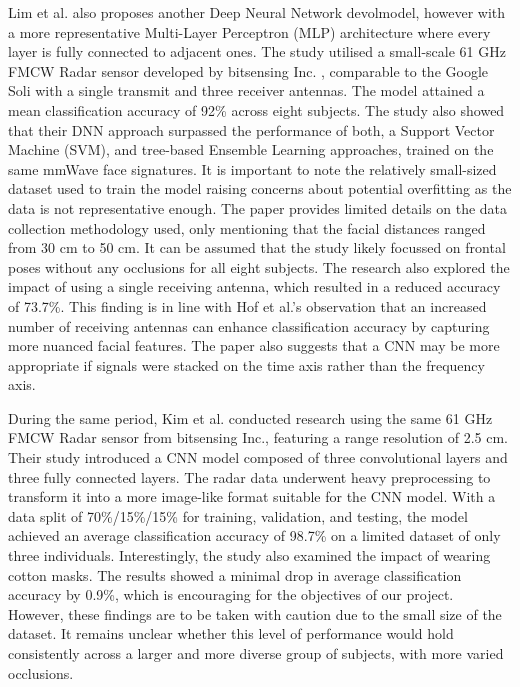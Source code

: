 \documentclass{interim}
\begin{document}
Lim et al. \cite{lim2020dnn} also proposes another Deep Neural Network devolmodel, however with a more representative Multi-Layer Perceptron (MLP) architecture where every layer is fully connected to adjacent ones. The study utilised a small-scale 61 GHz FMCW Radar sensor developed by bitsensing Inc. \cite{bitsensing2020bts60}, comparable to the Google Soli with a single transmit and three receiver antennas. The model attained a mean classification accuracy of 92\% across eight subjects. The study also showed that their DNN approach surpassed the performance of both, a Support Vector Machine (SVM), and tree-based Ensemble Learning approaches, trained on the same mmWave face signatures. It is important to note the relatively small-sized dataset used to train the model raising concerns about potential overfitting as the data is not representative enough. The paper provides limited details on the data collection methodology used, only mentioning that the facial distances ranged from 30 cm to 50 cm. It can be assumed that the study likely focussed on frontal poses without any occlusions for all eight subjects. The research also explored the impact of using a single receiving antenna, which resulted in a reduced accuracy of 73.7\%. This finding is in line with Hof et al.'s \cite{hof2020face} observation that an increased number of receiving antennas can enhance classification accuracy by capturing more nuanced facial features. The paper also suggests that a CNN may be more appropriate if signals were stacked on the time axis rather than the frequency axis.

During the same period, Kim et al. \cite{kim2020face} conducted research using the same 61 GHz FMCW Radar sensor from bitsensing Inc., featuring a range resolution of 2.5 cm. Their study introduced a CNN model composed of three convolutional layers and three fully connected layers. The radar data underwent heavy preprocessing to transform it into a more image-like format suitable for the CNN model. With a data split of 70\%/15\%/15\% for training, validation, and testing, the model achieved an average classification accuracy of 98.7\% on a limited dataset of only three individuals. Interestingly, the study also examined the impact of wearing cotton masks. The results showed a minimal drop in average classification accuracy by 0.9\%, which is encouraging for the objectives of our project. However, these findings are to be taken with caution due to the small size of the dataset. It remains unclear whether this level of performance would hold consistently across a larger and more diverse group of subjects, with more varied occlusions.
\end{document}
